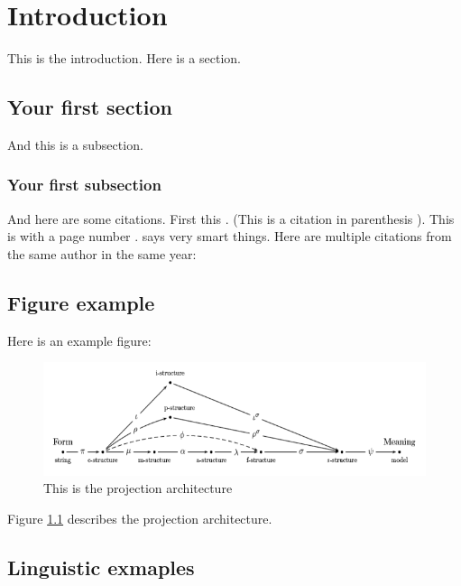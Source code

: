 \chapter{Introduction}
\label{ch:introduction}

This is the introduction. Here is a section.

\section{Your first section}

And this is a subsection.

\subsection{Your first subsection}

And here are some citations. First this \cite{kalouli2022negation}. (This is a citation in parenthesis \citealt{kalouli2022negation}). This is with a page number \citep[p. 5]{kalouli2022negation}. \citet{kalouli2022negation} says very smart things. Here are multiple citations from the same author in the same year: \citet{zymla2024ambiguity,Zymla2024}

\section{Figure example}

Here is an example figure:

\begin{figure}
    \centering
    \includegraphics[scale=0.5]{./tex/figures/parallelprojection.png}
    \caption{This is the projection architecture}
    \label{fig-label1}
\end{figure}

Figure \ref{fig-label1} describes the projection architecture. 

\section{Linguistic exmaples}

